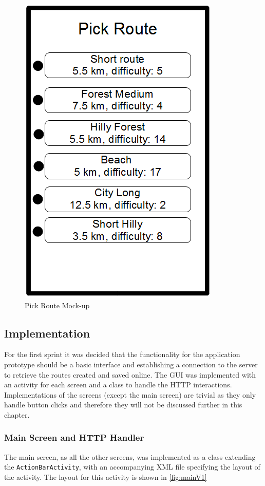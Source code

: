 \begin{figure}[ht]
\begin{center}
 \includegraphics[scale=0.4]{img/pickRouteMock.png}
 \caption{Pick Route Mock-up}
 \label{fig:pickRouteMock}
\end{center}
\end{figure}

\subsection{Implementation}
For the first sprint it was decided that the functionality for the application prototype should be a basic interface and establishing a connection to the server to retrieve the routes created and saved online. The \ac{GUI} was implemented with an activity for each screen and a class to handle the \ac{HTTP} interactions. Implementations of the screens (except the main screen) are trivial as they only handle button clicks and therefore they will not be discussed further in this chapter.

\subsubsection{Main Screen and HTTP Handler}
The main screen, as all the other screens, was implemented as a class extending the \texttt{ActionBarActivity}, with an accompanying \ac{XML} file specifying the layout of the activity. The layout for this activity is shown in \autoref{fig:mainV1} 

